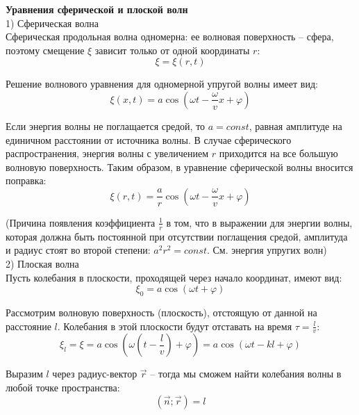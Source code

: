 \documentclass{article}
\begin{document}
	
	\textbf{Уравнения сферической и плоской волн}\\

	1) Сферическая волна\\

	Сферическая продольная волна одномерна: ее волновая поверхность -- сфера, поэтому смещение $\xi$ зависит только от одной координаты $r$:
	\begin{equation}
		\xi = \xi(r,t)
	\end{equation}

	Решение волнового уравнения для одномерной упругой волны имеет вид:
	\begin{equation}
		\xi(x,t) = a\cos(\omega t - \frac{\omega}{v}x + \varphi)
	\end{equation}

	Если энергия волны не поглащается средой, то $a=const$, равная амплитуде на единичном расстоянии от источника волны. В случае сферического распространения, энергия волны с увеличением $r$ приходится на все большую волновую поверхность. Таким образом, в уравнение сферической волны вносится поправка:
	\begin{equation}
		\xi(r,t) = \frac{a}{r}\cos(\omega t - \frac{\omega}{v}x + \varphi)
	\end{equation}

	(Причина появления коэффициента $\frac{1}{r}$ в том, что в выражении для энергии волны, которая должна быть постоянной при отсутствии поглащения средой, амплитуда и радиус стоят во второй степени: $a^2r^2=const$. См. энергия упругих волн)\\

	2) Плоская волна\\

	Пусть колебания в плоскости, проходящей через начало координат, имеют вид:
	\begin{equation}
		\xi_0 = a\cos(\omega t + \varphi)
	\end{equation}

	Рассмотрим волновую поверхность (плоскость), отстоящую от данной на расстояние $l$. Колебания в этой плоскости будут отставать на время $\tau = \frac{l}{v}$:
	\begin{equation}
		\xi_l = \xi = a\cos(\omega(t-\frac{l}{v})+\varphi) = a\cos(\omega t - kl + \varphi)
	\end{equation}

	Выразим $l$ через радиус-вектор $\vec r$ -- тогда мы сможем найти колебания волны в любой точке пространства:
	\begin{equation}
		(\vec n; \vec r) = l
	\end{equation}
\end{document}
